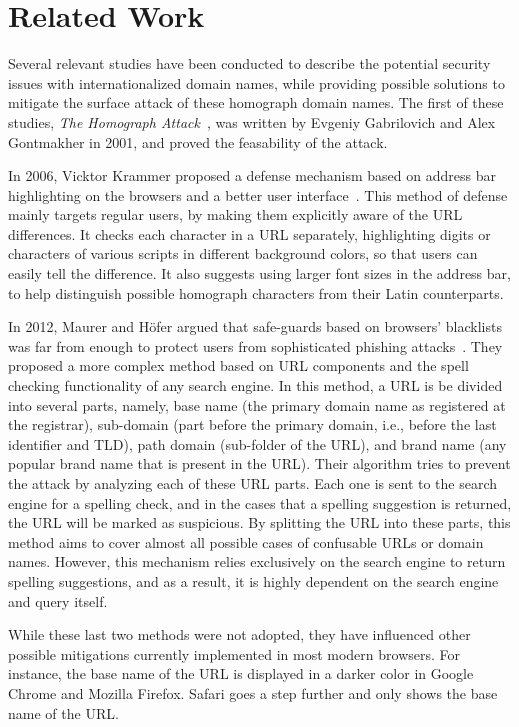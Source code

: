 \documentclass[letterpaper,twocolumn,10pt]{article}
\begin{document}
\section{Related Work}
Several relevant studies have been conducted to describe the potential security issues with internationalized domain names, while providing possible solutions to mitigate the surface attack of these homograph domain names. The first of these studies, \textit{The Homograph Attack}~\cite{gabrilovich2002}, was written by Evgeniy Gabrilovich and Alex Gontmakher in 2001, and proved the feasability of the attack.

In 2006, Vicktor Krammer proposed a defense mechanism based on address bar highlighting on the browsers and a better user interface~\cite{krammer2006}.
This method of defense mainly targets regular users, by making them explicitly aware of the URL differences.
It checks each character in a URL separately, highlighting digits or characters of various scripts in different background colors, so that users can easily tell the difference.
It also suggests using larger font sizes in the address bar, to help distinguish possible homograph characters from their Latin counterparts.

In 2012, Maurer and H\"{o}fer argued that safe-guards based on browsers' blacklists was far from enough to protect users from sophisticated phishing attacks~\cite{maurer2012}.
They proposed a more complex method based on URL components and the spell checking functionality of any search engine.
In this method, a URL is be divided into several parts, namely, base name (the primary domain name as registered at the registrar), sub-domain (part before the primary domain, i.e., before the last identifier and TLD), path domain (sub-folder of the URL), and brand name (any popular brand name that is present in the URL).
Their algorithm tries to prevent the attack by analyzing each of these URL parts.
Each one is sent to the search engine for a spelling check, and in the cases that a spelling suggestion is returned, the URL will be marked as suspicious.
By splitting the URL into these parts, this method aims to cover almost all possible cases of confusable URLs or domain names.
However, this mechanism relies exclusively on the search engine to return spelling suggestions, and as a result, it is highly dependent on the search engine and query itself.

While these last two methods were not adopted, they have influenced other possible mitigations currently implemented in most modern browsers.
For instance, the base name of the URL is displayed in a darker color in Google Chrome and Mozilla Firefox.
Safari goes a step further and only shows the base name of the URL.
\end{document}
